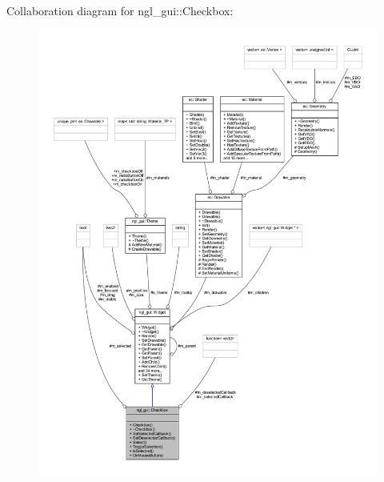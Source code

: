 Collaboration diagram for ngl\+\_\+gui\+:\+:Checkbox\+:
\nopagebreak
\begin{figure}[H]
\begin{center}
\leavevmode
\includegraphics[width=350pt]{classngl__gui_1_1_checkbox__coll__graph}
\end{center}
\end{figure}
